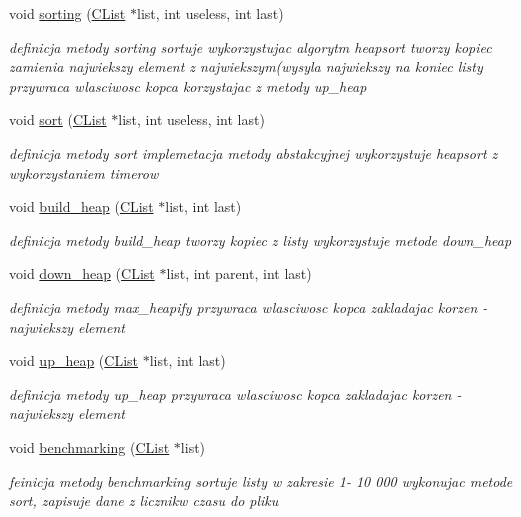 \begin{DoxyCompactItemize}
\item 
void \hyperlink{class_c_heap_sort_af859772c7f50bb824b66cc6ec11b72b0}{sorting} (\hyperlink{class_c_list}{C\+List} $\ast$list, int useless, int last)
\begin{DoxyCompactList}\small\item\em definicja metody sorting sortuje wykorzystujac algorytm heapsort tworzy kopiec zamienia najwiekszy element z najwiekszym(wysyla najwiekszy na koniec listy przywraca wlasciwosc kopca korzystajac z metody up\+\_\+heap \end{DoxyCompactList}\item 
void \hyperlink{class_c_heap_sort_a31374a3fb22fdab6dfdd0ca0db1c5973}{sort} (\hyperlink{class_c_list}{C\+List} $\ast$list, int useless, int last)
\begin{DoxyCompactList}\small\item\em definicja metody sort implemetacja metody abstakcyjnej wykorzystuje heapsort z wykorzystaniem timerow \end{DoxyCompactList}\item 
void \hyperlink{class_c_heap_sort_a388bdc396f69e678ea3f3e5a86a09aae}{build\+\_\+heap} (\hyperlink{class_c_list}{C\+List} $\ast$list, int last)
\begin{DoxyCompactList}\small\item\em definicja metody build\+\_\+heap tworzy kopiec z listy wykorzystuje metode down\+\_\+heap \end{DoxyCompactList}\item 
void \hyperlink{class_c_heap_sort_afb9acabdd2839321148916259f347a24}{down\+\_\+heap} (\hyperlink{class_c_list}{C\+List} $\ast$list, int parent, int last)
\begin{DoxyCompactList}\small\item\em definicja metody max\+\_\+heapify przywraca wlasciwosc kopca zakladajac korzen -\/ najwiekszy element \end{DoxyCompactList}\item 
void \hyperlink{class_c_heap_sort_a4b2aa9fa2e1f6284c72a943ce3f84dac}{up\+\_\+heap} (\hyperlink{class_c_list}{C\+List} $\ast$list, int last)
\begin{DoxyCompactList}\small\item\em definicja metody up\+\_\+heap przywraca wlasciwosc kopca zakladajac korzen -\/ najwiekszy element \end{DoxyCompactList}\item 
void \hyperlink{class_c_heap_sort_ae5ef55ad47223dc1308ce9ffbe11648a}{benchmarking} (\hyperlink{class_c_list}{C\+List} $\ast$list)
\begin{DoxyCompactList}\small\item\em feinicja metody benchmarking sortuje listy w zakresie 1-\/ 10 000 wykonujac metode sort, zapisuje dane z licznikw czasu do pliku \end{DoxyCompactList}\end{DoxyCompactItemize}


